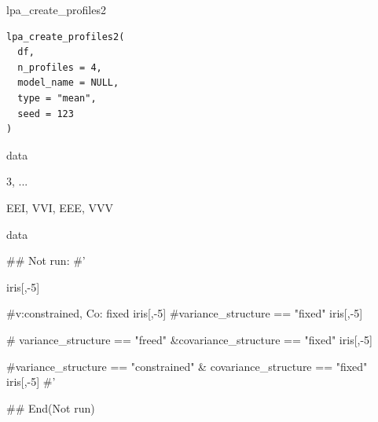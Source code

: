 \documentclass[a4paper]{book}
\begin{document}
%
\begin{Description}
lpa\_create\_profiles2
\end{Description}
%
\begin{Usage}
\begin{verbatim}
lpa_create_profiles2(
  df,
  n_profiles = 4,
  model_name = NULL,
  type = "mean",
  seed = 123
)
\end{verbatim}
\end{Usage}
%
\begin{Arguments}
\begin{ldescription}
\item[\code{df}] data

\item[\code{n\_profiles}] 3, ...

\item[\code{model\_name}] EEI, VVI, EEE, VVV
\end{ldescription}
\end{Arguments}
%
\begin{Value}
data
\end{Value}
%
\begin{Examples}
\begin{ExampleCode}

\#\# Not run: 
#'

iris[,-5] %

#v:constrained, Co: fixed
iris[,-5] %
#variance_structure == "fixed"
iris[,-5] %


# variance_structure == "freed" &covariance_structure == "fixed"
iris[,-5] %


#variance_structure == "constrained" & covariance_structure == "fixed"
iris[,-5] %
#'

## End(Not run)

\end{ExampleCode}
\end{Examples}
\end{document}
